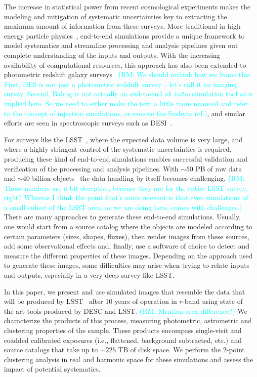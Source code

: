 \documentclass[twocolumn]{aastex62}
\newcommand{\rachel}[1]{{\textcolor{cyan}{{\textbf (RM: #1)}}}}
\begin{document}
The increase in statistical power from recent cosmological experiments makes the modeling and mitigation of systematic uncertainties key to extracting the maximum amount of information from these surveys. More traditional in high energy particle physics~\citep{Brun:118715, 2006JHEP...05..026S}, end-to-end simulations provide a unique framework to
model systematics and streamline processing and analysis pipelines given out complete understanding of the inputs and outputs. With the increasing availability of computational resources, this approach has also been extended to photometric redshift galaxy surveys~\citep{2016MNRAS.457..786S,2016ApJ...817...25B} \rachel{We should rethink how we frame this.  First, DES is not just a photometric redshift survey -- let's call it an imaging survey.  Second, Balrog is not actually an end-to-end {\em ab initio} simulation tool as is implied here.  So we need to either make the text a little more nuanced and refer to the concept of injection simulations, or remove the Suchyta ref.}, and similar efforts are seen in spectroscopic surveys such as DESI~\citep{2016arXiv161100036D}.

For surveys like the LSST~\citep{Overview}, where the expected data volume is very large, and where a highly stringent control of the systematic uncertainties is required, producing these
kind of end-to-end simulations enables successful validation and verification of the processing and analysis pipelines. With $\sim 50$ PB of raw data and $\sim 40$ billion objects~\citep{Overview} the data handling by itself becomes challenging. \rachel{Those numbers are a bit deceptive, because they are for the entire LSST survey, right?  Whereas I think the point that's more relevant is that even simulations of a small subset of the LSST area, as we are doing here, comes with challenges.} There are many approaches to generate these end-to-end simulations. Usually, one would start from a source catalog where the objects are modeled according to certain parameters (sizes, shapes, fluxes), then render images from these sources, add some observational effects and, finally, use a software of choice to detect and measure the different properties of these images. Depending on the approach used to generate these images, some difficulties may arise when trying to relate inputs and outputs, especially in a very deep survey like LSST.

In this paper, we present and use simulated images that resemble the data that will be produced by
LSST~\citep{Overview} after 10 years of operation in $r$-band using state of the art tools produced by DESC and LSST. \rachel{Mention area difference?} We characterize the products of this process, measuring photometric, astrometric and clustering properties of the sample. These products encompass single-visit and coadded calibrated exposures (i.e., flattened, background subtracted, etc.) and source catalogs that take up to $\sim 225$ TB of disk space. We perform the 2-point clustering analysis in real and harmonic space for these simulations and assess the impact of potential systematics.
\end{document}
